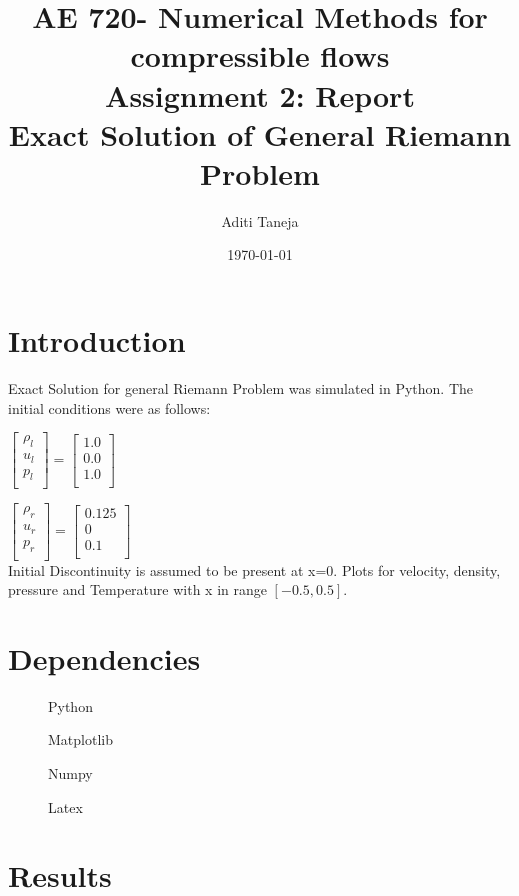 \documentclass{article}
\title{AE 720- Numerical Methods for compressible flows \\ Assignment 2: Report \\ Exact Solution of General Riemann Problem}
\author{Aditi Taneja}
\date{\today}
\begin{document}
\maketitle
\section*{Introduction}

Exact Solution for general Riemann Problem was simulated in Python. The initial conditions were as follows:

$\begin{bmatrix}
    \rho_l \\ 
    u_l \\
    p_l \\
    \end{bmatrix} = \begin{bmatrix}
    1.0\\ 
    0.0 \\
    1.0 \\
    \end{bmatrix} $

$\begin{bmatrix}
    \rho_r \\ 
    u_r \\
    p_r \\
    \end{bmatrix} = \begin{bmatrix}
    0.125\\ 
    0\\
    0.1 \\
    \end{bmatrix} $
\\Initial Discontinuity is assumed to be present at x=0. Plots for velocity, density, pressure and Temperature with x in range $[-0.5,0.5]$.


\section*{Dependencies}
\begin{description}
\item[]Python
\item[]Matplotlib
\item[]Numpy
\item[]Latex
\end{description}

\section*{Results}
\end{document}
